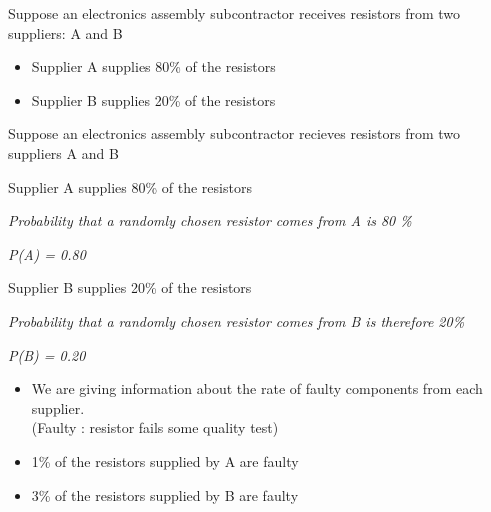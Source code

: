 \documentclass{beamer}
\begin{document}
\begin{frame} %
\Large
Suppose an electronics assembly subcontractor receives resistors from two suppliers: A and B

\begin{itemize}
\item Supplier A supplies 80\% of the resistors
\vspace{2cm}
\item Supplier B supplies 20\% of the resistors
\vspace{2cm}
\end{itemize}
\end{frame}

\begin{frame} %
\Large
Suppose an electronics assembly subcontractor recieves resistors from two suppliers A and B

\begin{itemize}
\item Supplier A supplies 80\% of the resistors
{
\Large

\item \textit{Probability that a randomly chosen resistor comes from A is 80 \%}
\item \textit{P(A) = 0.80 }

}
\item Supplier B supplies 20\% of the resistors
\item \textit{Probability that a randomly chosen resistor comes from B is therefore 20\%}
\item \textit{P(B) = 0.20}
\end{itemize}
\end{frame}
\begin{frame} %
\Large
\begin{itemize}
\item We are giving information about the rate of faulty components from each supplier. \\(Faulty : resistor fails some quality test)
\vspace{1cm}
\item 1\% of the resistors supplied by A are faulty
\vspace{1cm}
\item 3\% of the resistors supplied by B are faulty 
\vspace{1cm}
\end{itemize}
\end{frame}
\end{document}
